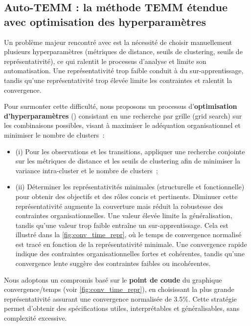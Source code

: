 \subsection{Auto-TEMM : la méthode TEMM étendue avec optimisation des hyperparamètres}

Un problème majeur rencontré avec  est la nécessité de choisir manuellement plusieurs hyperparamètres (métriques de distance, seuils de clustering, seuils de représentativité), ce qui ralentit le processus d'analyse et limite son automatisation. Une représentativité trop faible conduit à du sur-apprentissage, tandis qu'une représentativité trop élevée limite les contraintes et ralentit la convergence.


Pour surmonter cette difficulté, nous proposons un processus d'\textbf{optimisation d'hyperparamètres} () consistant en une recherche par grille (grid search) sur les combinaisons possibles, visant à maximiser le adéquation  organisationnel et minimiser le nombre de clusters~:

\begin{itemize}
  \item (i) Pour les observations et les transitions, appliquer une recherche conjointe sur les métriques de distance et les seuils de clustering afin de minimiser la variance intra-cluster et le nombre de clusters~;
  \item (ii) Déterminer les représentativités minimales (structurelle et fonctionnelle) pour obtenir des objectifs et des rôles concis et pertinents. Diminuer cette représentativité augmente la couverture mais réduit la robustesse des contraintes organisationnelles. Une valeur élevée limite la généralisation, tandis qu'une valeur trop faible entraîne un sur-apprentissage. Cela est illustré dans la \autoref{fig:conv_time_repr}, où le temps de convergence normalisé est tracé en fonction de la représentativité minimale. Une convergence rapide indique des contraintes organisationnelles fortes et cohérentes, tandis qu'une convergence lente suggère des contraintes faibles ou incohérentes.
\end{itemize}

Nous adoptons un compromis basé sur le \textbf{point de coude} du graphique convergence/temps (voir \autoref{fig:conv_time_repr}), en choisissant la plus grande représentativité assurant une convergence normalisée de 3.5\%. Cette stratégie permet d'obtenir des spécifications utiles, interprétables et généralisables, sans complexité excessive.

